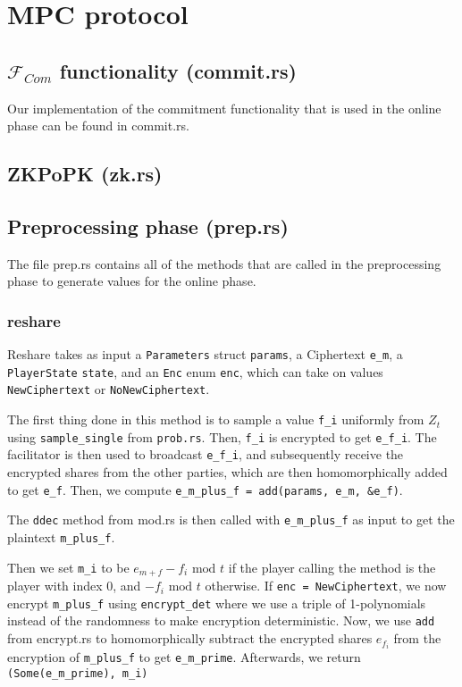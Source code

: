 \documentclass[../main.tex]{subfiles}
\begin{document}
\section{MPC protocol}

\subsection{$\mathcal{F}_{Com}$ functionality (commit.rs)}
Our implementation of the commitment functionality that is used in the online phase can be found in commit.rs.

\subsection{ZKPoPK (zk.rs)}

\subsection{Preprocessing phase (prep.rs)}
The file prep.rs contains all of the methods that are called in the preprocessing phase to generate values for the online phase.
\subsubsection{reshare}
Reshare takes as input a \lstinline{Parameters} struct \lstinline{params}, a Ciphertext \lstinline{e_m}, a  \lstinline{PlayerState} \lstinline{state}, and an \lstinline{Enc} enum \lstinline{enc}, which can take on values \lstinline{NewCiphertext} or \lstinline{NoNewCiphertext}.

The first thing done in this method is to sample a value \lstinline{f_i} uniformly from $Z_t$ using \lstinline{sample_single} from \lstinline{prob.rs}. Then, \lstinline{f_i} is encrypted to get \lstinline{e_f_i}.
The facilitator is then used to broadcast \lstinline{e_f_i}, and subsequently receive the encrypted shares from the other parties, which are then homomorphically added to get \lstinline{e_f}. Then, we compute \lstinline{e_m_plus_f = add(params, e_m, &e_f)}.

The \lstinline{ddec} method from mod.rs is then called with \lstinline{e_m_plus_f} as input to get the plaintext \lstinline{m_plus_f}.

Then we set \lstinline{m_i} to be $e_{m + f} - f_i \text{ mod } t$ if the player calling the method is the player with index $0$, and $- f_i \text{ mod } t$ otherwise. If \lstinline{enc = NewCiphertext}, we now encrypt \lstinline{m_plus_f} using \lstinline{encrypt_det} where we use a triple of 1-polynomials instead of the randomness to make encryption deterministic. Now, we use \lstinline{add} from encrypt.rs to homomorphically subtract the encrypted shares $e_{f_i}$ from the encryption of \lstinline{m_plus_f} to get \lstinline{e_m_prime}. Afterwards, we return \lstinline{(Some(e_m_prime), m_i)}
\end{document}
